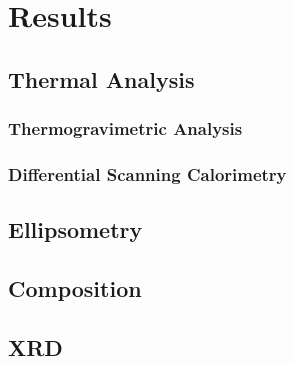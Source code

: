 \chapter{Results}
\label{ch:Results}
\thispagestyle{empty}



\section{Thermal Analysis}
\label{chap:Results-Thermal}



\subsection{Thermogravimetric Analysis}



\subsection{Differential Scanning Calorimetry}


\section{Ellipsometry}
\label{chap:Results-Ellipsometry}

\lipsum


\section{Composition}
\label{chap:Results-Composition}

\lipsum



\section{XRD}
\label{chap:Results-XRD}

\lipsum








